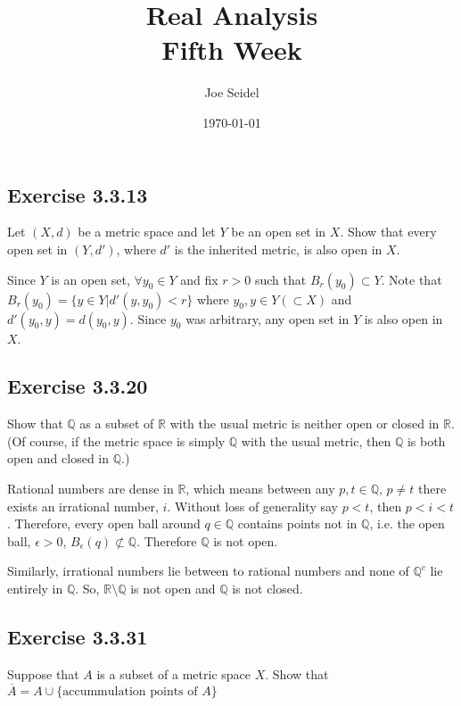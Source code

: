 \documentclass{tufte-book}
\title{Real Analysis\\Fifth Week }
\author{Joe Seidel}
\date{\today}
\theoremstyle{mytheoremstyle}
\theoremstyle{mylemstyle}
\theoremstyle{mydefstyle}
\begin{document}
\maketitle
{}
\newpage
{}

\subsection{Exercise 3.3.13}
Let $(X,d)$ be a metric space and let $Y$ be an open set in $X$.  Show that every open set in $(Y,d')$, where $d'$ is the inherited metric, is also open in $X$.

Since $Y$ is an open set, $\forall y_0 \in Y$ and fix $r > 0$ such that $B_r(y_0) \subset Y$. Note that $B_r(y_0) = \{ y \in Y | d'(y,y_0) < r\}$ where $y_0, y \in Y (\subset X)$ and $d'(y_0, y) = d(y_0, y)$.  Since $y_0$ was arbitrary, any open set in $Y$ is also open in $X$.

\subsection{Exercise 3.3.20}
Show that $\mathbb{Q}$ as a subset of $\mathbb{R}$ with the usual metric is neither open or closed in $\mathbb{R}$.  (Of course, if the metric space is simply $\mathbb{Q}$ with the usual metric, then $\mathbb{Q}$ is both open and closed in $\mathbb{Q}$.)

Rational numbers are dense in $\mathbb{R}$, which means between any $p,t \in \mathbb{Q}$, $p \neq t$ there exists an irrational number, $i$.  Without loss of generality say $p < t$, then $p < i < t$.  Therefore, every open ball around $q \in \mathbb{Q}$ contains points not in $\mathbb{Q}$, i.e. the open ball, $\epsilon > 0$, $B_\epsilon(q) \not\subset \mathbb{Q}$.  Therefore $\mathbb{Q}$ is not open.

Similarly, irrational numbers lie between to rational numbers and none of $\mathbb{Q}^c$ lie entirely in $\mathbb{Q}$.  So, $\mathbb{R}\setminus\mathbb{Q}$ is not open and $\mathbb{Q}$ is not closed.

\subsection{Exercise 3.3.31}
Suppose that $A$ is a subset of a metric space $X$.  Show that $\overline{A} = A \cup \{ \text{accummulation points of }A\}$
\end{document}
